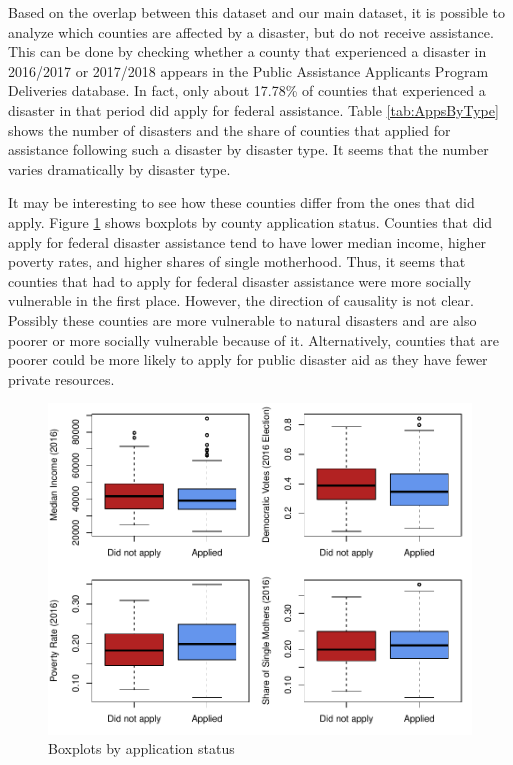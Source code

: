 Based on the overlap between this dataset and our main dataset, it is possible to analyze which counties are affected by a disaster, but do not receive assistance. This can be done by checking whether a county that experienced a disaster in 2016/2017 or 2017/2018 appears in the Public Assistance Applicants Program Deliveries database. In fact, only about 17.78\% of counties that experienced a disaster in that period did apply for federal assistance. Table \ref{tab:AppsByType} shows the number of disasters and the share of counties that applied for assistance following such a disaster by disaster type. It seems that the number varies dramatically by disaster type.



It may be interesting to see how these counties differ from the ones that did apply. Figure \ref{AssistCovBoxplot} shows boxplots by county application status. Counties that did apply for federal disaster assistance tend to have lower median income, higher poverty rates, and higher shares of single motherhood. Thus, it seems that counties that had to apply for federal disaster assistance were more socially vulnerable in the first place. However, the direction of causality is not clear. Possibly these counties are more vulnerable to natural disasters and are also poorer or more socially vulnerable because of it. Alternatively, counties that are poorer could be more likely to apply for public disaster aid as they have fewer private resources.

\begin{figure}[!h]
	\centering
	\includegraphics[scale=1]{"../Code & Data/AssistanceCovBoxplot.pdf"}
	\caption{Boxplots by application status}
	\label{AssistCovBoxplot}
\end{figure}

